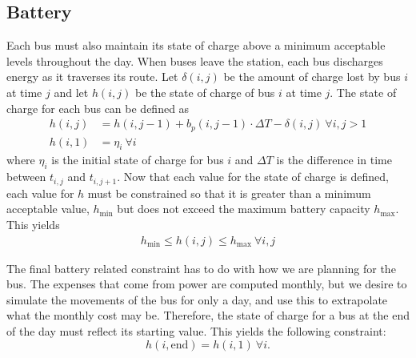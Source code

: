 \subsection{Battery}
\par Each bus must also maintain its state of charge above a minimum acceptable levels throughout the day.  When buses leave the station, each bus discharges energy as it traverses its route. Let $\delta(i,j)$ be the amount of charge lost by bus $i$ at time $j$ and let $h(i,j)$ be the state of charge of bus $i$ at time $j$. The state of charge for each bus can be defined as
\begin{equation}\label{eqn:battery:socPropagation}\begin{aligned}
	h(i,j) &= h(i,j-1) + b_p(i,j - 1)\cdot \Delta T - \delta(i,j) \ \forall i,j>1 \\
	h(i,1) &= \eta_i \ \forall i
\end{aligned}\end{equation}
where $\eta_i$ is the initial state of charge for bus $i$ and $\Delta T$ is the difference in time between $t_{i,j}$ and $t_{i,j+1}$.
Now that each value for the state of charge is defined, each value for $h$ must be constrained so that it is greater than a minimum acceptable value, $h_{\text{min}}$ but does not exceed the maximum battery capacity $h_{\text{max}}$. This yields
\begin{equation} \label{eqn:battery:soc}\begin{aligned}
	h_{\text{min}} \leq h(i,j) \leq h_{\text{max}} \ \forall i,j
\end{aligned}\end{equation}
\par The final battery related constraint has to do with how we are planning for the bus.  The expenses that come from power are computed monthly, but we desire to simulate the movements of the bus for only a day, and use this to extrapolate what the monthly cost may be.  Therefore, the state of charge for a bus at the end of the day must reflect its starting value.  This yields the following constraint:
\begin{equation}\label{eqn:battery:busPower}
	h(i,\text{end}) = h(i,1) \ \forall i.
\end{equation}

